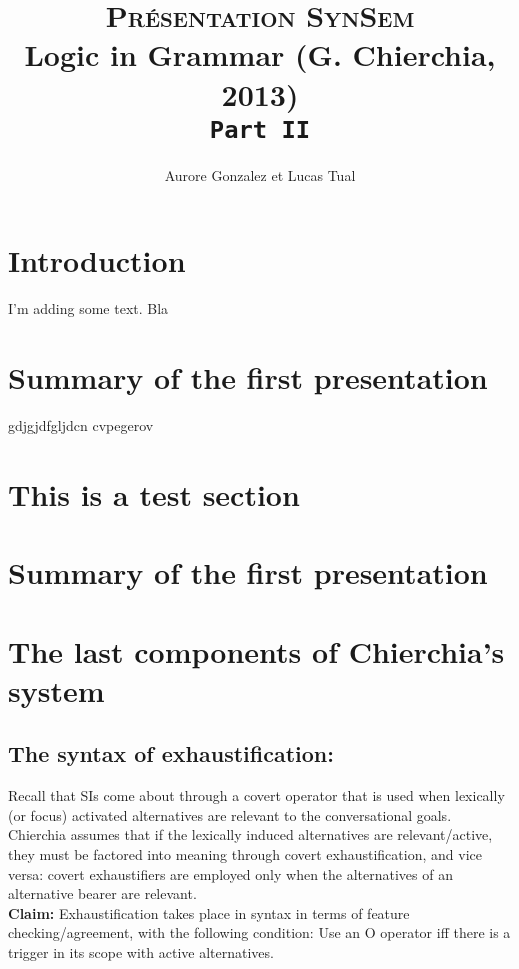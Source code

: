 \documentclass[a4paper,11pt]{article}
\title{\textsc{Présentation SynSem}\\Logic in Grammar (G. Chierchia, 2013)\\\vspace{0.3cm}\texttt{Part II}}
\author{Aurore Gonzalez et Lucas Tual}
\affil{LLING - University of Nantes}
\begin{document}
\maketitle
\tableofcontents


\section*{Introduction}
I'm adding some text. Bla

\section{Summary of the first presentation}

gdjgjdfgljdcn cvpegerov


\section{This is a test section}

\section{Summary of the first presentation}

\section{The last components of Chierchia's system}
\subsection{The syntax of exhaustification:}

Recall that SIs come about through a covert operator that is used when lexically (or focus) activated alternatives are relevant to the conversational goals. Chierchia assumes that if the lexically induced alternatives are relevant/active, they must be factored into meaning through covert exhaustification, and vice versa: covert exhaustifiers are employed only when the alternatives of an alternative bearer are relevant.
\\\textbf{Claim:} Exhaustification takes place in syntax in terms of feature checking/agreement, with the following condition: Use an O operator iff there is a trigger in its scope with active alternatives. 
\end{document}
